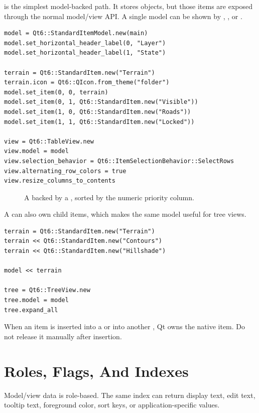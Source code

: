  is the simplest model-backed path. It stores  objects, but those items are exposed through the normal model/view API. A single model can be shown by , , or .

\begin{lstlisting}[style=crystal]
model = Qt6::StandardItemModel.new(main)
model.set_horizontal_header_label(0, "Layer")
model.set_horizontal_header_label(1, "State")

terrain = Qt6::StandardItem.new("Terrain")
terrain.icon = Qt6::QIcon.from_theme("folder")
model.set_item(0, 0, terrain)
model.set_item(0, 1, Qt6::StandardItem.new("Visible"))
model.set_item(1, 0, Qt6::StandardItem.new("Roads"))
model.set_item(1, 1, Qt6::StandardItem.new("Locked"))

view = Qt6::TableView.new
view.model = model
view.selection_behavior = Qt6::ItemSelectionBehavior::SelectRows
view.alternating_row_colors = true
view.resize_columns_to_contents
\end{lstlisting}

\begin{figure}[htbp]
  \centering
  \caption{A  backed by a , sorted by the numeric priority column.}
\end{figure}

A  can also own child items, which makes the same model useful for tree views.

\begin{lstlisting}[style=crystal]
terrain = Qt6::StandardItem.new("Terrain")
terrain << Qt6::StandardItem.new("Contours")
terrain << Qt6::StandardItem.new("Hillshade")

model << terrain

tree = Qt6::TreeView.new
tree.model = model
tree.expand_all
\end{lstlisting}

When an item is inserted into a  or into another , Qt owns the native item. Do not release it manually after insertion.

\section{Roles, Flags, And Indexes}

Model/view data is role-based. The same index can return display text, edit text, tooltip text, foreground color, sort keys, or application-specific values.

